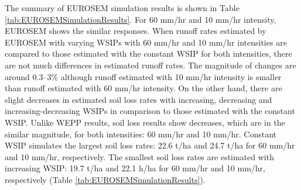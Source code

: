 
The summary of EUROSEM simulation results is shown in Table
\ref{tab:EUROSEMSimulationResults}. For 60 mm/hr and 10 mm/hr intensity,
EUROSEM shows the similar responses. When runoff rates estimated by EUROSEM with
varying WSIPs with 60 mm/hr and 10 mm/hr intensities are compared to those
estimated with the constant WSIP for both intensities, there are not much
differences in estimated runoff rates. The magnitude of changes are around
0.3--3\% although runoff estimated with 10 mm/hr intensity is smaller than
runoff estimated with 60 mm/hr intensity. On the other hand, there are slight
decreases in estimated soil loss rates with increasing, decreasing and
increasing-decreasing WSIPs in comparison to those estimated with the constant
WSIP. Unlike WEPP results, soil loss results show decreases, which are in the
similar magnitude, for both intensities: 60 mm/hr and 10 mm/hr. Constant WSIP
simulates the largest soil loss rates: 22.6 t/ha and 24.7 t/ha for 60 mm/hr and
10 mm/hr, respectively. The smallest soil loss rates are estimated with
increasing WSIP: 19.7 t/ha and 22.1 h/ha for 60 mm/hr and 10 mm/hr, respectively
(Table \ref{tab:EUROSEMSimulationResults}).

